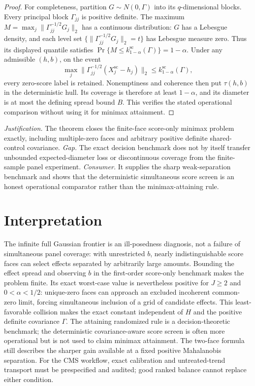 \documentclass{article}
\begin{document}
\begin{proof}
For completeness, partition \(G\sim N(0,\Gamma)\) into its \(q\)-dimensional blocks. Every principal block \(\Gamma_{jj}\) is positive definite. The maximum \(M=\max_j\lVert\Gamma_{jj}^{-1/2}G_j\rVert_2\) has a continuous distribution: \(G\) has a Lebesgue density, and each level set \(\{\lVert\Gamma_{jj}^{-1/2}G_j\rVert_2=t\}\) has Lebesgue measure zero. Thus its displayed quantile satisfies \(\Pr\{M\leq k_{1-\alpha}^{\mathrm{sc}}(\Gamma)\}=1-\alpha\). Under any admissible \((h,b)\), on the event
\[
 \max_j\lVert\Gamma_{jj}^{-1/2}(X_j^{\mathrm{sc}}-h_j)\rVert_2
 \leq k_{1-\alpha}^{\mathrm{sc}}(\Gamma),
\]
every zero-score label is retained. Nonemptiness and coherence then put \(\tau(h,b)\) in the deterministic hull. Its coverage is therefore at least \(1-\alpha\), and its diameter is at most the defining spread bound \(B\). This verifies the stated operational comparison without using it for minimax attainment.
\end{proof}
\par\smallskip\noindent \textit{Justification.} The theorem closes the finite-face score-only minimax problem exactly, including multiple-zero faces and arbitrary positive definite shared-control covariance. \textit{Gap.} The exact decision benchmark does not by itself transfer unbounded expected-diameter loss or discontinuous coverage from the finite-sample panel experiment. \textit{Consumer.} It supplies the sharp weak-separation benchmark and shows that the deterministic simultaneous score screen is an honest operational comparator rather than the minimax-attaining rule.

\section{Interpretation}

The infinite full Gaussian frontier is an ill-posedness diagnosis, not a failure of simultaneous panel coverage: with unrestricted \(b\), nearly indistinguishable score faces can select effects separated by arbitrarily large amounts. Bounding the effect spread and observing \(b\) in the first-order score-only benchmark makes the problem finite. Its exact worst-case value is nevertheless positive for \(J\geq2\) and \(0<\alpha<1/2\): unique-zero faces can approach an excluded incoherent common-zero limit, forcing simultaneous inclusion of a grid of candidate effects. This least-favorable collision makes the exact constant independent of \(H\) and the positive definite covariance \(\Gamma\). The attaining randomized rule is a decision-theoretic benchmark; the deterministic covariance-aware score screen is often more operational but is not used to claim minimax attainment. The two-face formula still describes the sharper gain available at a fixed positive Mahalanobis separation. For the CMS workflow, exact calibration and untreated-trend transport must be prespecified and audited; good ranked balance cannot replace either condition.
\end{document}

